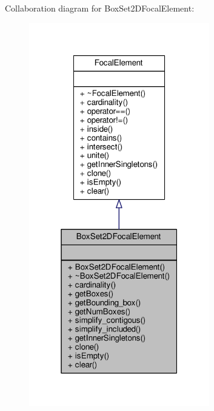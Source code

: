 Collaboration diagram for Box\+Set2\+D\+Focal\+Element\+:\nopagebreak
\begin{figure}[H]
\begin{center}
\leavevmode
\includegraphics[width=223pt]{classBoxSet2DFocalElement__coll__graph}
\end{center}
\end{figure}
